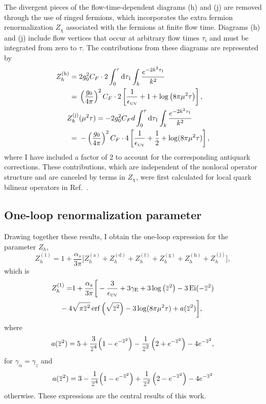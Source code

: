 The divergent pieces of the flow-time-dependent diagrams (h) and (j) are removed through the use of ringed fermions, which incorporates the extra fermion renormalization $Z_\chi$ associated with the fermions at finite flow time. Diagrams (h) and (j) include flow vertices that occur at arbitrary flow times $\tau_i$ and must be integrated from zero to $\tau$. The contributions from these diagrams are represented by
\begin{align}
Z_h^\mathrm{(h)} = {} & 2 g_0^2C_F\cdot 2\int_0^\tau \mathrm{d}\tau_1
\int_k \frac{e^{-2k^2\tau_1}}{k^2} \nonumber \\
= {} & \left(\frac{g_0}{4\pi}\right)^2  C_F \cdot 2\left[\frac{1}{\epsilon_{\scriptscriptstyle\mathrm{UV}}}
+1+\log\big(8\pi\mu^2\tau\big)\right], \label{eq:hth}\\
Z_h^\mathrm{(j)}{} & (\mu^2\tau) = {-} 2g_0^2C_F  d\int_0^\tau \mathrm{d}\tau_1\int_k\frac{e^{-2k^2\tau_1}}{k^2} \nonumber \\
= {} & -\left(\frac{g_0}{4\pi}\right)^2C_F \cdot 4\left[\frac{1}{\epsilon_{\scriptscriptstyle\mathrm{UV}}} +\frac{1}{2} + \log(8\pi\mu^2\tau)\right]\label{eq:htj},
\end{align}
where I have included a factor of 2 to account for the corresponding antiquark corrections. These contributions, which are independent of the nonlocal operator structure and are canceled by terms in $Z_\chi$, were first calculated for local quark bilinear operators in Ref.~\cite{Endo:2015iea}.

\subsection{One-loop renormalization parameter}

Drawing together these results, I obtain the one-loop expression for the parameter $Z_h$,
\begin{equation}
Z_h^{(1)} =   1 + \frac{\alpha_s}{3\pi}\Big[Z_h^\mathrm{(a)}+Z_h^\mathrm{(d)} +Z_h^\mathrm{(f)}+Z_h^\mathrm{(g)}+Z_h^\mathrm{(h)}+Z_h^\mathrm{(j)}\Big],
\end{equation}
which is
\begin{align}
Z_h^{(1)} = & {} 1 + \frac{\alpha_s}{3\pi}\bigg[-\frac{3}{\epsilon_{\scriptscriptstyle\mathrm{UV}}}+3\gamma_{\mathrm{E}}+3\log\left(\overline{z}^2\right) -3\operatorname{Ei}(-\overline{z}^2)\nonumber\\
{}  -4&\sqrt{\pi\overline{z}^2}\operatorname{erf}\left(\sqrt{\overline{z}^2}\right) -3\log(8\pi\mu^2\tau)+a(\overline{z}^2)\bigg],
\end{align}
where
\begin{equation}
a(\overline{z}^2) =  5 + \frac{3}{\overline{z}^4} \Big(1-e^{-\overline{z}^2}\Big)- \frac{1}{\overline{z}^2} \left(2+e^{-\overline{z}^2}\right)-4e^{-\overline{z}^2},
\end{equation}
for $\gamma_\alpha = \gamma_z$ and
\begin{equation}
a(\overline{z}^2) =  3 - \frac{1}{\overline{z}^4} \Big(1-e^{-\overline{z}^2}\Big)+ \frac{1}{\overline{z}^2} \left(2-e^{-\overline{z}^2}\right)-4e^{-\overline{z}^2}
\end{equation}
otherwise. These expressions are the central results of this work.

